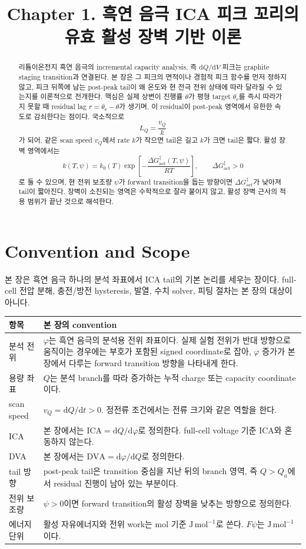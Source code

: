\documentclass[11pt,a4paper]{article}
\title{Chapter 1. 흑연 음극 ICA 피크 꼬리의 유효 활성 장벽 기반 이론}
\author{}
\date{}
\newcommand{\dd}{\mathrm{d}}
\newcommand{\ICA}{\mathrm{ICA}}
\newcommand{\DVA}{\mathrm{DVA}}
\begin{document}
\maketitle

\begin{abstract}
리튬이온전지 흑연 음극의 incremental capacity analysis, 즉 \(\dd Q/\dd V\) 피크는 graphite staging transition과 연결된다. 본 장은 그 피크의 면적이나 경험적 피크 함수를 먼저 정하지 않고, 피크 뒤쪽에 남는 post-peak tail이 왜 온도와 현 전극 전위 상태에 따라 달라질 수 있는지를 이론적으로 전개한다. 핵심은 실제 상변이 진행률 \(\theta\)가 평형 target \(\theta_{\mathrm e}\)를 즉시 따라가지 못할 때 residual lag \(r=\theta_{\mathrm e}-\theta\)가 생기며, 이 residual이 post-peak 영역에서 유한한 속도로 감쇠한다는 점이다. 국소적으로
\[
L_Q=\frac{v_Q}{k}
\]
가 되어, 같은 scan speed \(v_Q\)에서 rate \(k\)가 작으면 tail은 길고 \(k\)가 크면 tail은 짧다. 활성 장벽 영역에서는
\[
k(T,\psi)=k_0(T)
\exp\!\left[-\frac{\Delta G_{\mathrm{act}}^\ddagger(T,\psi)}{RT}\right],
\qquad
\Delta G_{\mathrm{act}}^\ddagger>0
\]
로 둘 수 있으며, 현 전위 보조량 \(\psi\)가 forward transition을 돕는 방향이면 \(\Delta G_{\mathrm{act}}^\ddagger\)가 낮아져 tail이 짧아진다. 장벽이 소진되는 영역은 수학적으로 잘라 붙이지 않고, 활성 장벽 근사의 적용 범위가 끝난 것으로 해석한다.
\end{abstract}

\section{Convention and Scope}

본 장은 흑연 음극 하나의 분석 좌표에서 ICA tail의 기본 논리를 세우는 장이다. full-cell 전압 분해, 충전/방전 hysteresis, 발열, 수치 solver, 피팅 절차는 본 장의 대상이 아니다.

\begin{longtable}{p{}p{}}
\toprule
항목 & 본 장의 convention \\
\midrule
\endhead
분석 전위 & \(\varphi\)는 흑연 음극의 분석용 전위 좌표이다. 실제 실험 전위가 반대 방향으로 움직이는 경우에는 부호가 포함된 signed coordinate로 잡아, \(\varphi\) 증가가 본 장에서 다루는 forward transition 방향을 나타내게 한다. \\
용량 좌표 & \(Q\)는 분석 branch를 따라 증가하는 누적 charge 또는 capacity coordinate이다. \\
scan speed & \(v_Q=\dd Q/\dd t>0\). 정전류 조건에서는 전류 크기와 같은 역할을 한다. \\
ICA & 본 장에서는 \(\ICA=\dd Q/\dd\varphi\)로 정의한다. full-cell voltage 기준 ICA와 혼동하지 않는다. \\
DVA & 본 장에서는 \(\DVA=\dd\varphi/\dd Q\)로 정의한다. \\
tail 방향 & post-peak tail은 transition 중심을 지난 뒤의 branch 영역, 즉 \(Q>Q_a\)에서 residual 진행이 남아 있는 부분이다. \\
전위 보조량 & \(\psi>0\)이면 forward transition의 활성 장벽을 낮추는 방향으로 정의한다. \\
에너지 단위 & 활성 자유에너지와 전위 work는 mol 기준 \(\mathrm{J\,mol^{-1}}\)로 쓴다. \(F\psi\)는 \(\mathrm{J\,mol^{-1}}\)이다. \\
\bottomrule
\end{longtable}
\end{document}
